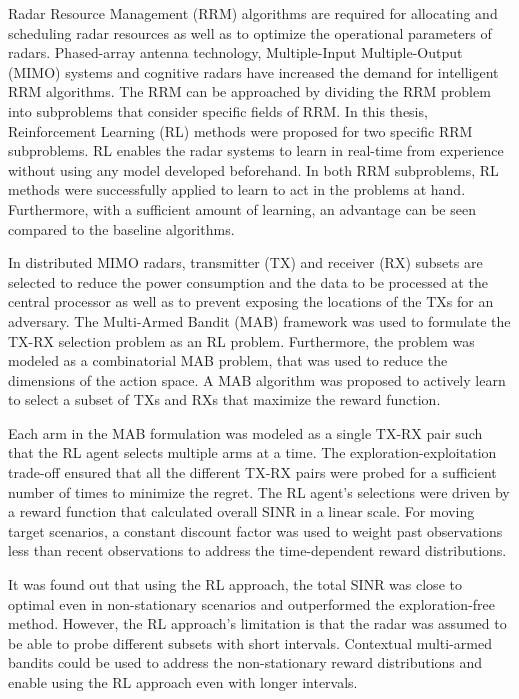 \documentclass[english, 12pt, a4paper, elec, utf8, a-1b, online]{aaltothesis}
\begin{document}
Radar Resource Management (RRM) algorithms are required for allocating and scheduling radar resources as well as to optimize the operational parameters of radars.  
Phased-array antenna technology, Multiple-Input Multiple-Output (MIMO) systems and cognitive radars have increased the demand for intelligent RRM algorithms.
The RRM can be approached by dividing the RRM problem into subproblems that consider specific fields of RRM.
In this thesis, Reinforcement Learning (RL) methods were proposed for two specific RRM subproblems.
RL enables the radar systems to learn in real-time from experience without using any model developed beforehand.
In both RRM subproblems, RL methods were successfully applied to learn to act in the problems at hand. 
Furthermore, with a sufficient amount of learning, an advantage can be seen compared to the baseline algorithms.

In distributed MIMO radars, transmitter (TX) and receiver (RX) subsets are selected to reduce the power consumption and the data to be processed at the central processor as well as to prevent exposing the locations of the TXs for an adversary.
The Multi-Armed Bandit (MAB) framework was used to formulate the TX-RX selection problem as an RL problem.
Furthermore, the problem was modeled as a combinatorial MAB problem, that was used to reduce the dimensions of the action space.
A MAB algorithm was proposed to actively learn to select a subset of TXs and RXs that maximize the reward function.

Each arm in the MAB formulation was modeled as a single TX-RX pair such that the RL agent selects multiple arms at a time. 
The exploration-exploitation trade-off ensured that all the different TX-RX pairs were probed for a sufficient number of times to minimize the regret. 
The RL agent's selections were driven by a reward function that calculated overall SINR in a linear scale.
For moving target scenarios, a constant discount factor was used to weight past observations less than recent observations to address the time-dependent reward distributions.

It was found out that using the RL approach, the total SINR was close to optimal even in non-stationary scenarios and outperformed the exploration-free method. 
However, the RL approach's limitation is that the radar was assumed to be able to probe different subsets with short intervals.
Contextual multi-armed bandits \cite{Lu2010} could be used to address the non-stationary reward distributions and enable using the RL approach even with longer intervals. 
\end{document}
